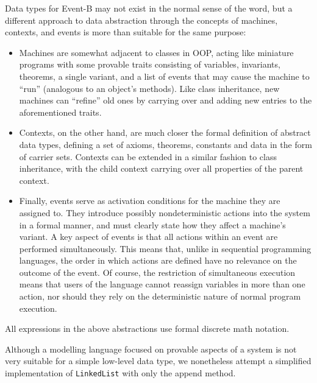 \documentclass{article}
\begin{document}
Data types for Event-B may not exist in the normal sense of the word, but a different approach to data abstraction
through the concepts of machines, contexts, and events is more than suitable for the same purpose:
\begin{itemize}
    \item Machines are somewhat adjacent to classes in OOP, acting like miniature
    programs with some provable traits consisting of variables, invariants, theorems, a single variant, and a list of
    events that may cause the machine to ``run'' (analogous to an object's methods).
    Like class inheritance, new machines can ``refine'' old ones by
    carrying over and adding new entries to the aforementioned traits.
    \item Contexts, on the other hand, are much closer the formal definition of abstract data types,
    defining a set of axioms, theorems, constants and data in the form of carrier sets.
    Contexts can be extended in a similar fashion to class inheritance, with the child context carrying over all properties
    of the parent context.
    \item Finally, events serve as activation conditions for the machine they are assigned to.
    They introduce possibly nondeterministic actions into the system in a formal manner, and must clearly state
    how they affect a machine's variant. A key aspect of events is that all actions within an event are performed simultaneously.
    This means that, unlike in sequential programming languages, the order in which actions are defined have no relevance
    on the outcome of the event. Of course, the restriction of simultaneous execution means that users of the language
    cannot reassign variables in more than one action, nor should they rely on the deterministic nature of normal program execution.
\end{itemize}
All expressions in the above abstractions use formal discrete math notation.

Although a modelling language focused on provable aspects of a system
is not very suitable for a simple low-level data type,
we nonetheless attempt a simplified implementation of \texttt{LinkedList} with only the append method.
\end{document}
